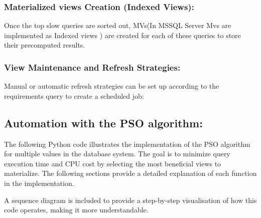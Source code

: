 \subsubsection{ Materialized views Creation (Indexed Views):}\label{Query_decomposition} Once the top slow queries are sorted out, MVs(In MSSQL Server Mvs are implemented as Indexed views ) are created for each of these queries to store their precomputed results.\vspace{.4cm}

  \vspace{.4cm}

  \subsubsection{View Maintenance and Refresh Strategies:}\label{View_maintainance} Manual or automatic refresh strategies can be set up according to the requirements query to create a scheduled job: \vspace{.4cm}




\subsection{Automation with the PSO algorithm:} \label{Cost_evaluation}
 The following Python code illustrates the implementation of the PSO algorithm for multiple values in the database system. The goal is to minimize query execution time and CPU cost by selecting the most beneficial views to materialize. The following sections provide a detailed explanation of each function in the implementation.




\vspace{.4cm}

A sequence diagram is included to provide a step-by-step visualisation of how this code operates, making it more understandable.
  


